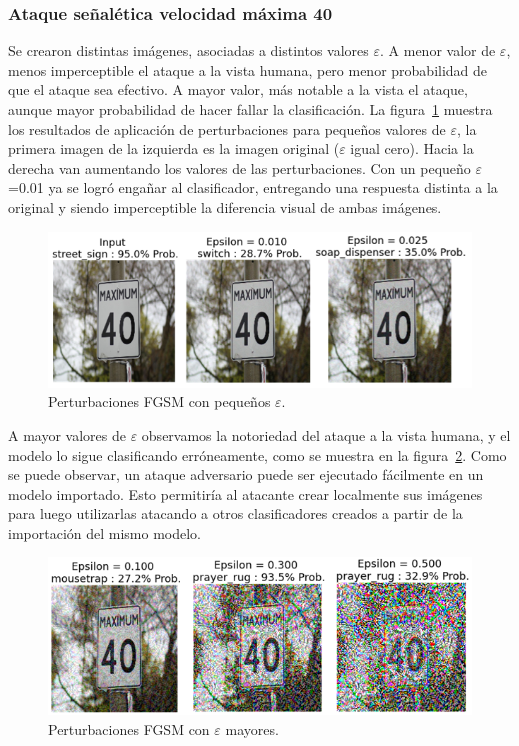 \subsubsection{Ataque señalética velocidad máxima 40}

Se crearon distintas imágenes, asociadas a distintos valores $\varepsilon$. A menor valor de $\varepsilon$, menos imperceptible el ataque a la vista humana, pero menor probabilidad de que el ataque sea efectivo. A mayor valor, más notable a la vista el ataque, aunque mayor probabilidad de hacer fallar la clasificación. La figura~\ref{fig:47} muestra los resultados de aplicación de perturbaciones para pequeños valores de $\varepsilon$, la primera imagen de la izquierda es la imagen original ($\varepsilon$ igual cero). Hacia la derecha van aumentando los valores de las perturbaciones. Con un pequeño $\varepsilon$=0.01 ya se logró engañar al clasificador, entregando una respuesta distinta a la original y siendo imperceptible la diferencia visual de ambas imágenes. 

\begin{figure}[!h]
\centering
\includegraphics[scale = 0.85]{Figures/figura_47.PNG}
\decoRule
\caption[Perturbaciones FGSM con pequeños $\varepsilon$ señalética velocidad]{Perturbaciones FGSM con pequeños $\varepsilon$.}
\label{fig:47}
\end{figure}

A mayor valores de $\varepsilon$ observamos la notoriedad del ataque a la vista humana, y el modelo lo sigue clasificando erróneamente, como se muestra en la figura~\ref{fig:48}. Como se puede observar, un ataque adversario puede ser ejecutado fácilmente en un modelo importado. Esto permitiría al atacante crear localmente sus imágenes para luego utilizarlas atacando a otros clasificadores creados a partir de la importación del mismo modelo.

\begin{figure}[!h]
\centering
\includegraphics[scale = 0.80]{Figures/figura_48.PNG}
\decoRule
\caption[Perturbaciones FGSM con mayores $\varepsilon$ señalética velocidad]{Perturbaciones FGSM con $\varepsilon$ mayores.}
\label{fig:48}
\end{figure}


